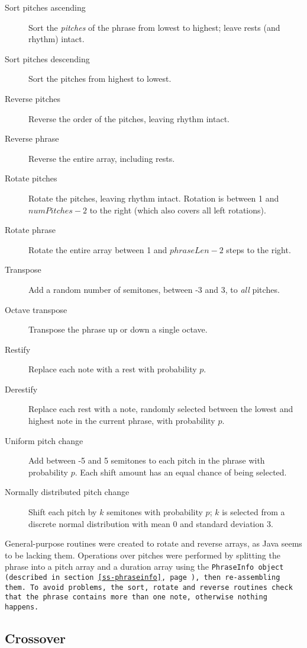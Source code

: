 \begin{description}
\item[Sort pitches ascending] Sort the \emph{pitches} of the phrase from lowest to highest; leave rests (and rhythm) intact.
\item[Sort pitches descending] Sort the pitches from highest to lowest.
\item[Reverse pitches] Reverse the order of the pitches, leaving rhythm intact.
\item[Reverse phrase] Reverse the entire array, including rests.
\item[Rotate pitches] Rotate the pitches, leaving rhythm intact. Rotation is between 1 and $numPitches - 2$ to the right (which also covers all left rotations).
\item[Rotate phrase] Rotate the entire array between 1 and $phraseLen - 2$ steps to the right.
\item[Transpose] Add a random number of semitones, between -3 and 3, to \emph{all} pitches.
\item[Octave transpose] Transpose the phrase up or down a single octave.
\item[Restify] Replace each note with a rest with probability $p$.
\item[Derestify] Replace each rest with a note, randomly selected between the lowest and highest note in the current phrase, with probability $p$.
\item[Uniform pitch change] Add between -5 and 5 semitones to each pitch in the phrase with probability $p$. Each shift amount has an equal chance of being selected.
\item[Normally distributed pitch change] Shift each pitch by $k$ semitones with probability $p$; $k$ is selected from a discrete normal distribution with mean 0 and standard deviation 3.
\end{description}

General-purpose routines were created to rotate and reverse arrays, as Java seems to be lacking them. Operations over pitches were performed by splitting the phrase into a pitch array and a duration array using the \tt{PhraseInfo} object (described in section \ref{ss-phraseinfo}, page \pageref{ss-phraseinfo}), then re-assembling them. To avoid problems, the sort, rotate and reverse routines check that the phrase contains more than one note, otherwise nothing happens.

\subsection{Crossover}

